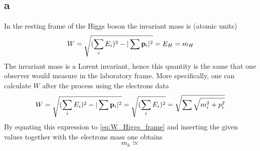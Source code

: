 \subsection*{a}
In the resting frame of the Higgs boson the invariant mass is (atomic units)
\begin{equation}
    W = \sqrt{(\sum_i E_i)^2 - |\sum \mathbf{p}_i|^2} = E_H = m_H
    \label{eq:W_Higgs_frame}
\end{equation}
The invariant mass is a Lorent invariant, hence this quantity is the same that one observer would measure in the laboratory frame. 
More specifically, one can calculate $W$ after the process using the electrons data
\begin{equation*}
    W = \sqrt{(\sum_i E_i)^2 - |\sum \mathbf{p}_i|^2} = \sqrt{(\sum_i E_i)^2} = \sqrt{\sum \sqrt{m_i^2 + p_i^2}}
\end{equation*}
By equating this expression to \ref{eq:W_Higgs_frame} and inserting the given values together with the electrons mass one obtains
\begin{equation*}
    m_h \simeq 
\end{equation*}

